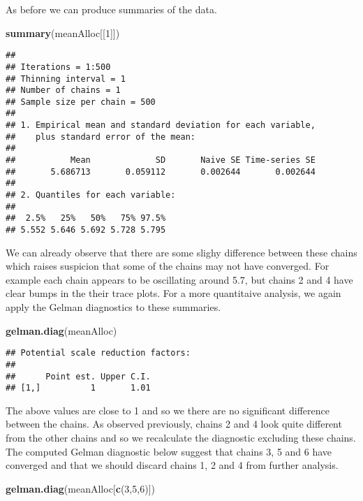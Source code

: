 \documentclass[]{article}
\newenvironment{Shaded}{\begin{snugshade}}{\end{snugshade}}
\newcommand{\KeywordTok}[1]{\textcolor[rgb]{0.13,0.29,0.53}{\textbf{{#1}}}}
\newcommand{\DecValTok}[1]{\textcolor[rgb]{0.00,0.00,0.81}{{#1}}}
\newcommand{\NormalTok}[1]{{#1}}
\begin{document}
As before we can produce summaries of the data.

\begin{Shaded}
\begin{Highlighting}[]
\KeywordTok{summary}\NormalTok{(meanAlloc[[}\DecValTok{1}\NormalTok{]])}
\end{Highlighting}
\end{Shaded}

\begin{verbatim}
## 
## Iterations = 1:500
## Thinning interval = 1 
## Number of chains = 1 
## Sample size per chain = 500 
## 
## 1. Empirical mean and standard deviation for each variable,
##    plus standard error of the mean:
## 
##           Mean             SD       Naive SE Time-series SE 
##       5.686713       0.059112       0.002644       0.002644 
## 
## 2. Quantiles for each variable:
## 
##  2.5%   25%   50%   75% 97.5% 
## 5.552 5.646 5.692 5.728 5.795
\end{verbatim}

We can already observe that there are some slighy difference between
these chains which raises suspicion that some of the chains may not have
converged. For example each chain appears to be oscillating around 5.7,
but chains 2 and 4 have clear bumps in the their trace plots. For a more
quantitaive analysis, we again apply the Gelman diagnostics to these
summaries.

\begin{Shaded}
\begin{Highlighting}[]
\KeywordTok{gelman.diag}\NormalTok{(meanAlloc)}
\end{Highlighting}
\end{Shaded}

\begin{verbatim}
## Potential scale reduction factors:
## 
##      Point est. Upper C.I.
## [1,]          1       1.01
\end{verbatim}

The above values are close to 1 and so we there are no significant
difference between the chains. As observed previously, chains 2 and 4
look quite different from the other chains and so we recalculate the
diagnostic excluding these chains. The computed Gelman diagnostic below
suggest that chains 3, 5 and 6 have converged and that we should discard
chains 1, 2 and 4 from further analysis.

\begin{Shaded}
\begin{Highlighting}[]
\KeywordTok{gelman.diag}\NormalTok{(meanAlloc[}\KeywordTok{c}\NormalTok{(}\DecValTok{3}\NormalTok{,}\DecValTok{5}\NormalTok{,}\DecValTok{6}\NormalTok{)])}
\end{Highlighting}
\end{Shaded}
\end{document}
